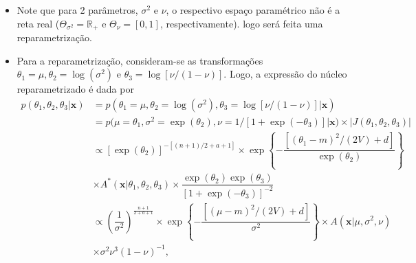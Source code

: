 \documentclass[9pt]{beamer}
\begin{document}
\begin{frame}
\begin{itemize}
\justifying	
\item Note que para 2 parâmetros, $\sigma^2$ e $\nu$, o respectivo espaço paramétrico não é a reta real ($\Theta_{\sigma^2} = \mathbb{R}_+$ e $\Theta_{\nu} = [0,1]$, respectivamente). logo será feita uma reparametrização.
\item Para a reparametrização, consideram-se as transformações $\theta_1 = \mu, \theta_2 = \log(\sigma^2)$ e $\theta_3 = \log[\nu/(1-\nu)]$. Logo, a expressão do núcleo reparametrizado é dada por
\begin{align}
p(\theta_1, \theta_2, \theta_3 | \bm{x})
&= p(\theta_1 = \mu, \theta_2 = \log(\sigma^2), \theta_3 = \log[\nu/(1-\nu)] | \bm{x}) \nonumber \\
&= p(\mu = \theta_1, \sigma^2 = \exp(\theta_2), \nu = 1/[1 + \exp(-\theta_3)] | \bm{x}) \times |J(\theta_1, \theta_2, \theta_3)| \nonumber \\
&\propto \left[\exp(\theta_2)\right]^{-[(n + 1)/2 + a + 1]} \times \exp\left\{-\dfrac{\left[(\theta_1 - m)^2 / (2V) + d\right]}{\exp(\theta_2)}\right\} \nonumber \\
&\times A^*(\bm{x} | \theta_1, \theta_2, \theta_3) \times  \dfrac{\exp(\theta_2) \exp(\theta_3)}{\left[1 + \exp(-\theta_3)\right]^{-2}} \nonumber \\	&\propto \left(\dfrac{1}{\sigma^2}\right)^{\frac{n + 1}{2 + a + 1}} \times \exp\left\{-\dfrac{\left[(\mu - m)^2 / (2V) + d\right]}{\sigma^2}\right\} \times A(\bm{x} | \mu, \sigma^2, \nu) \nonumber \\
&\times \sigma^2 \nu^3(1-\nu)^{-1}, \label{eq:sir_dpre}
\end{align}
\end{itemize}
\end{frame}
\end{document}

